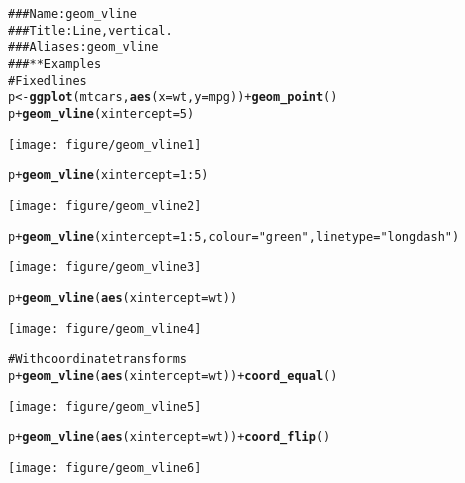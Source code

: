 \documentclass[a4paper,titlepage]{tufte-handout}\usepackage{graphicx, color}
\makeatletter
\def\maxwidth{ %
  \ifdim\Gin@nat@width>\linewidth
    \linewidth
  \else
    \Gin@nat@width
  \fi
}
\newcommand{\hlfunctioncall}[1]{\textcolor[rgb]{0.501960784313725,0,0.329411764705882}{\textbf{#1}}}%
\newcommand{\hlstring}[1]{\textcolor[rgb]{0.6,0.6,1}{#1}}%
\newcommand{\hlcomment}[1]{\textcolor[rgb]{0.180392156862745,0.6,0.341176470588235}{#1}}%
\newenvironment{kframe}{%
 \def\at@end@of@kframe{}%
 \ifinner\ifhmode%
  \def\at@end@of@kframe{\end{minipage}}%
  \begin{minipage}{\columnwidth}%
 \fi\fi%
 \def\FrameCommand##1{\hskip\@totalleftmargin \hskip-\fboxsep
 \colorbox{shadecolor}{##1}\hskip-\fboxsep
     \hskip-\linewidth \hskip-\@totalleftmargin \hskip\columnwidth}%
 \MakeFramed {\advance\hsize-\width
   \@totalleftmargin\z@ \linewidth\hsize
   \@setminipage}}%
 {\par\unskip\endMakeFramed%
 \at@end@of@kframe}
\newenvironment{knitrout}{}{} %
\makeatother
\begin{document}
\begin{knitrout}
\color{fgcolor}\begin{kframe}
\begin{alltt}
\hlcomment{### Name: geom_vline}
\hlcomment{### Title: Line, vertical.}
\hlcomment{### Aliases: geom_vline}
\hlcomment{### ** Examples}
\hlcomment{# Fixed lines}
p <- \hlfunctioncall{ggplot}(mtcars, \hlfunctioncall{aes}(x = wt, y = mpg)) + \hlfunctioncall{geom_point}()
p + \hlfunctioncall{geom_vline}(xintercept = 5)
\end{alltt}
\end{kframe}\texttt{[image: figure/geom\_vline1]} \begin{kframe}\begin{alltt}
p + \hlfunctioncall{geom_vline}(xintercept = 1:5)
\end{alltt}
\end{kframe}\texttt{[image: figure/geom\_vline2]} \begin{kframe}\begin{alltt}
p + \hlfunctioncall{geom_vline}(xintercept = 1:5, colour=\hlstring{"green"}, linetype = \hlstring{"longdash"})
\end{alltt}
\end{kframe}\texttt{[image: figure/geom\_vline3]} \begin{kframe}\begin{alltt}
p + \hlfunctioncall{geom_vline}(\hlfunctioncall{aes}(xintercept = wt))
\end{alltt}
\end{kframe}\texttt{[image: figure/geom\_vline4]} \begin{kframe}\begin{alltt}
\hlcomment{# With coordinate transforms}
p + \hlfunctioncall{geom_vline}(\hlfunctioncall{aes}(xintercept = wt)) + \hlfunctioncall{coord_equal}()
\end{alltt}
\end{kframe}\texttt{[image: figure/geom\_vline5]} \begin{kframe}\begin{alltt}
p + \hlfunctioncall{geom_vline}(\hlfunctioncall{aes}(xintercept = wt)) + \hlfunctioncall{coord_flip}()
\end{alltt}
\end{kframe}\texttt{[image: figure/geom\_vline6]} \begin{kframe}\begin{alltt}

\end{alltt}
\end{kframe}
\end{knitrout}
\end{document}

